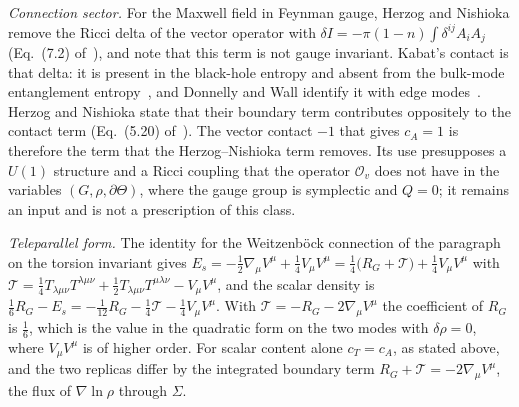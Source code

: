 \emph{Connection sector.} For the Maxwell field in Feynman gauge, Herzog and Nishioka remove the Ricci delta of the vector operator with \(\delta I=-\pi(1-n)\int\delta^{ij}A_iA_j\) (Eq.~(7.2) of~\cite{HerzogNishioka2016}), and note that this term is not gauge invariant. Kabat's contact is that delta: it is present in the black-hole entropy and absent from the bulk-mode entanglement entropy~\cite{Kabat1995}, and Donnelly and Wall identify it with edge modes~\cite{DonnellyWall2016}. Herzog and Nishioka state that their boundary term contributes oppositely to the contact term (Eq.~(5.20) of~\cite{HerzogNishioka2016}). The vector contact \(-1\) that gives \(c_A=1\) is therefore the term that the Herzog--Nishioka term removes. Its use presupposes a \(U(1)\) structure and a Ricci coupling that the operator \(\mathcal O_v\) does not have in the variables \((G,\rho,\partial\Theta)\), where the gauge group is symplectic and \(Q=0\); it remains an input and is not a prescription of this class.

\emph{Teleparallel form.} The identity for the Weitzenb\"ock connection of the paragraph on the torsion invariant gives \(E_s=-\tfrac12\nabla_\mu V^\mu+\tfrac14V_\mu V^\mu=\tfrac14\bigl(R_G+\mathcal T\bigr)+\tfrac14V_\mu V^\mu\) with \(\mathcal T=\tfrac14T_{\lambda\mu\nu}T^{\lambda\mu\nu}+\tfrac12T_{\lambda\mu\nu}T^{\mu\lambda\nu}-V_\mu V^\mu\), and the scalar density is \(\tfrac16R_G-E_s=-\tfrac1{12}R_G-\tfrac14\mathcal T-\tfrac14V_\mu V^\mu\). With \(\mathcal T=-R_G-2\nabla_\mu V^\mu\) the coefficient of \(R_G\) is \(\tfrac16\), which is the value in the quadratic form on the two modes with \(\delta\rho=0\), where \(V_\mu V^\mu\) is of higher order. For scalar content alone \(c_T=c_A\), as stated above, and the two replicas differ by the integrated boundary term \(R_G+\mathcal T=-2\nabla_\mu V^\mu\), the flux of \(\nabla\ln\rho\) through \(\Sigma\).

